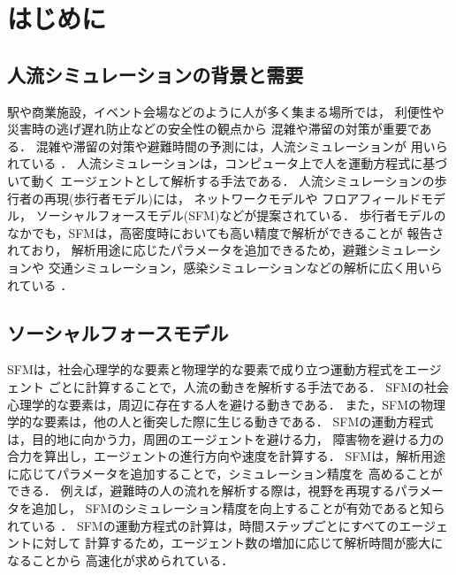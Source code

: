 \newcommand{\tensaku}[1]{#1}

\chapter{はじめに}
\label{sec:intro}
\tensaku{\section{人流シミュレーションの背景と需要}}
駅や商業施設，イベント会場などのように人が多く集まる場所では，
利便性や災害時の逃げ遅れ防止などの安全性の観点から
混雑や滞留の対策が重要である\cite{taisaku1}\cite{taisaku2}．
混雑や滞留の対策や避難時間の予測には，人流シミュレーションが
用いられている
\cite{sim_jirei1}\cite{sim_jirei2}\cite{sim_jirei3}\cite{sim_jirei8}\cite{sim_jirei7}．
人流シミュレーションは，コンピュータ上で人を運動方程式に基づいて動く
エージェントとして解析する手法である．
人流シミュレーションの歩行者の再現(歩行者モデル)には，
ネットワークモデルや
フロアフィールドモデル\cite{floa_field3}\cite{floa_field1}\cite{floa_field2}，
ソーシャルフォースモデル(SFM)\cite{helbing_sfm}などが提案されている．
歩行者モデルのなかでも，SFMは，高密度時においても高い精度で解析ができることが
報告されており\cite{???}，
解析用途に応じたパラメータを追加できるため，避難シミュレーションや
交通シミュレーション，感染シミュレーションなどの解析に広く用いられている
\cite{mas_pandemic}\cite{sfm_hinan1}\cite{sfm_hinan2}\cite{sfm_hinan3}
\cite{intro_gunshu}
．

\tensaku{\section{ソーシャルフォースモデル}}
SFMは，社会心理学的な要素と物理学的な要素で成り立つ運動方程式をエージェント
ごとに計算することで，人流の動きを解析する手法である\cite{helbing_sfm}．
SFMの社会心理学的な要素は，周辺に存在する人を避ける動きである．
また，SFMの物理学的な要素は，他の人と衝突した際に生じる動きである．
SFMの運動方程式は，目的地に向かう力，周囲のエージェントを避ける力，
障害物を避ける力の合力を算出し，エージェントの進行方向や速度を計算する．
SFMは，解析用途に応じてパラメータを追加することで，シミュレーション精度を
高めることができる．
例えば，避難時の人の流れを解析する際は，視野を再現するパラメータを追加し，
SFMのシミュレーション精度を向上することが有効であると知られている
\cite{siya_ex2}\cite{siya_ex3}\cite{siya_ex4}
\cite{siya_ex5}\cite{siya_ex6}\cite{siya_ex7}．
SFMの運動方程式の計算は，時間ステップごとにすべてのエージェントに対して
計算するため，エージェント数の増加に応じて解析時間が膨大になることから
高速化が求められている．


